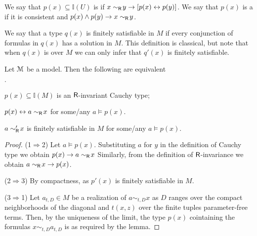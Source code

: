 \documentclass[10pt,oneside]{amsproc}
\newcommand{\mylabel}[1]{{#1}\hfill}
\renewenvironment{itemize}
  {\begin{list}{$\cdot$}{%
  \setlength{\parskip}{0mm}
  \setlength{\topsep}{.2\baselineskip}
  \setlength{\rightmargin}{0mm}
  \setlength{\listparindent}{0mm}
  \setlength{\itemindent}{0mm}
  \setlength{\labelwidth}{3ex}
  \setlength{\itemsep}{.2\baselineskip}
  \setlength{\parsep}{.2\baselineskip}
  \setlength{\partopsep}{0mm}
  \setlength{\labelsep}{1ex}
  \setlength{\leftmargin}{\labelwidth+\labelsep}
  \let\makelabel\mylabel}}{%
\end{list}}
\renewcommand*{\emph}[1]{%
   \smash{\tikz[baseline]\node[rectangle, fill=teal!25, rounded corners, inner xsep=0.5ex, inner ysep=0.2ex, anchor=base, minimum height = 2.7ex]{#1};}}
\begin{document}










We say that $p(x)\subseteq\mathds{I}(U)$ is \emph{${\sf R}$-invariant\/} if $x\sim_{\sf R}\!y\rightarrow[p(x)\leftrightarrow p(y)]$.
We say that $p(x)$ is a \emph{Cauchy type\/} if it is consistent and $p(x)\wedge p(y)\rightarrow x\sim_{\sf R}\!y$.

We say that a type $q(x)$ is finitely satisfiable in $M$ if every conjunction of formulas in $q(x)$ has a solution in $M$.
This definition is classical, but note that when $q(x)$ is over $M$ we can only infer that $q'(x)$ is finitely satisfiable.

\begin{lemma}
  Let  ${\EuScript M}$ be a model. 
  Then the following are equivalent
  \begin{itemize}
    \item[1.]  $p(x)\subseteq\mathds{I}(M)$ is an ${\sf R}$-invariant Cauchy type;
    \item[2.] $p(x)\leftrightarrow a\sim_{\sf R}\!x$ for some/any $a\models p(x)$.
    \item[3.] $a\sim'_{\sf R}\!x$ is finitely satisfiable in $M$ for some/any $a\models p(x)$.
  \end{itemize}
\end{lemma}

\begin{proof}
  (1$\Rightarrow$2)
  Let $a\models p(x)$.
  Substituting $a$ for $y$ in the definition of Cauchy type we obtain $p(x)\rightarrow a\sim_{\sf R}\!x$
  Similarly, from the definition of ${\sf R}$-invariance we obtain $a\sim_{\sf R}\!x\rightarrow p(x)$.

  (2$\Rightarrow$3) 
  By compactness, as $p'(x)$ is finitely satisfiable in $M$.

  (3$\Rightarrow$1)  
  Let $a_{t,D}\in M$ be a realization of $a\sim_{t,D}x$ as $D$ ranges over the compact neighborhoods of the diagonal and $t(x,z)$ over the finite tuples parameter-free terms.
  Then, by the uniqueness of the limit, the type $p(x)$ cointaining the formulas $x\sim_{t,D}a_{t,D}$ is as required by the lemma.
\end{proof}
\end{document}
